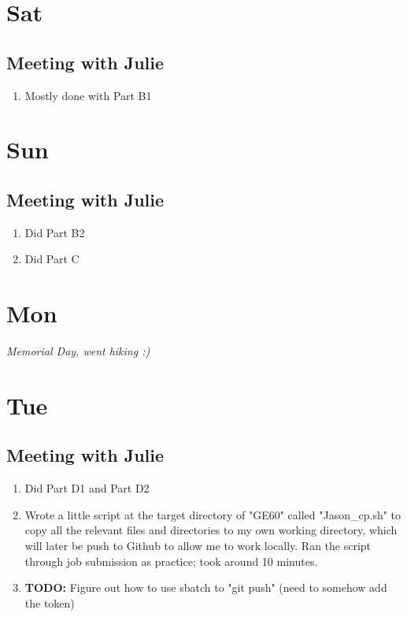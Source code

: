 \documentclass[12pt,letterpaper]{article}
\begin{document}
\section{Sat}
\subsection{Meeting with Julie}
\begin{enumerate}
  \item Mostly done with Part B1
\end{enumerate}


\section{Sun}
\subsection{Meeting with Julie}
\begin{enumerate}
  \item Did Part B2
  \item Did Part C
\end{enumerate}

\section{Mon}
\textit{Memorial Day, went hiking :)}

\section{Tue}
\subsection{Meeting with Julie}
\begin{enumerate}
  \item Did Part D1 and Part D2
  \item Wrote a little script at the target directory of "GE60" called 
    "Jason_cp.sh" to copy all the relevant files and directories to my
    own working directory, which will later be push to Github to allow
    me to work locally. Ran the script through job submission as practice;
    took around 10 minutes.
  \item \textbf{TODO:} Figure out how to use sbatch to "git push" (need to somehow
    add the token)
    \label{githubtodo}
\end{enumerate}
\end{document}
